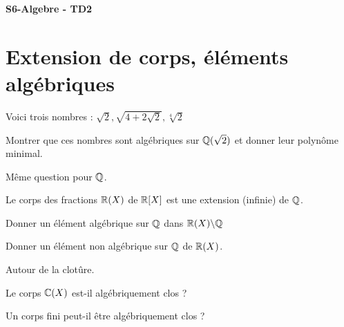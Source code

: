 \documentclass[french]{report}
\begin{document}
\begin{center}
    \huge{\textbf{S6-Algebre - TD2}}
\end{center}

\section*{Extension de corps, éléments algébriques}

\begin{exo}
    Voici trois nombres : \(\sqrt{2}, \sqrt{4+2\sqrt{2}}, \sqrt[4]{2}\)
    \begin{q}{1}
        Montrer que ces nombres sont algébriques sur \(\mathbb{Q}(\sqrt{2})\) et donner leur
        polynôme minimal.
    \end{q}
    \begin{q}{2}
        Même question pour \(\mathbb{Q}\).
    \end{q}
\end{exo}

\begin{exo}
    Le corps des fractions \(\mathbb{R}(X)\) de \(\mathbb{R}[X]\) est une extension (infinie) de \(\mathbb{Q}\).
    \begin{q}{1}
        Donner un élément algébrique sur \(\mathbb{Q}\) dans \(\mathbb{R}(X)\backslash\mathbb{Q}\)
    \end{q}
    \begin{q}{2}
        Donner un élément non algébrique sur \(\mathbb{Q}\) de \(\mathbb{R}(X)\).
    \end{q}
\end{exo}

\begin{exo}
    Autour de la clotûre.
    \begin{q}{1}
        Le corps \(\mathbb{C}(X)\) est-il algébriquement clos ?
    \end{q}
    \begin{q}{2}
        Un corps fini peut-il être algébriquement clos ?
    \end{q}
\end{exo}
\end{document}
